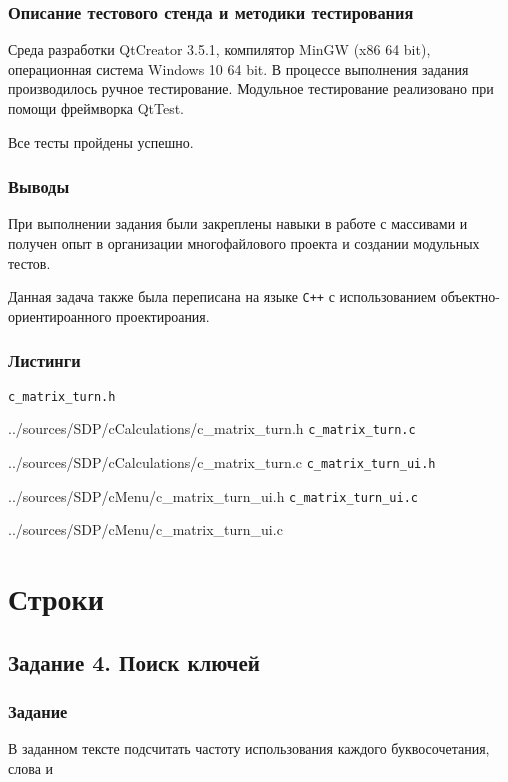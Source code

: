 \documentclass[12pt,a4paper]{report}
\begin{document}
\subsection{Описание тестового стенда и методики тестирования}
\hspace{\parindent}Среда разработки QtCreator 3.5.1, компилятор MinGW (x86 64 bit), операционная система Windows 10 64 bit.
В процессе выполнения задания производилось ручное тестирование.
Модульное тестирование реализовано при помощи фреймворка QtTest.

Все тесты пройдены успешно.
\subsection{Выводы}
\hspace{\parindent}При выполнении задания были закреплены навыки в работе с массивами и получен опыт в организации многофайлового проекта и создании модульных тестов.

Данная задача также была переписана на языке \verb|C++| с использованием объектно-ориентироанного проектироания.

\newpage
\subsection{Листинги}
\verb+c_matrix_turn.h+

{../sources/SDP/cCalculations/c_matrix_turn.h}
\verb+c_matrix_turn.c+

{../sources/SDP/cCalculations/c_matrix_turn.c}
\verb+c_matrix_turn_ui.h+

{../sources/SDP/cMenu/c_matrix_turn_ui.h}
\verb+c_matrix_turn_ui.c+

{../sources/SDP/cMenu/c_matrix_turn_ui.c}




\newpage
\chapter{Строки}
\section{Задание 4. Поиск ключей}
\subsection{Задание}

\hspace{\parindent}В заданном тексте подсчитать частоту использования каждого буквосочетания, слова и 
\end{document}
